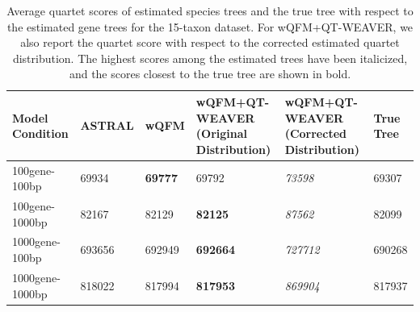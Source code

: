 \documentclass[10pt,a4paper]{article}
\begin{document}

\begin{table}[h!]
    \centering
    \caption{Average quartet scores of estimated species trees and the true tree with respect to the estimated gene trees for the 15-taxon dataset. For wQFM+QT-WEAVER, we also report the quartet score with respect to the corrected estimated quartet distribution. The highest scores among the estimated trees have been italicized, and the scores closest to the true tree are shown in bold.}
    \label{tab:15-quartet-scores-estimated}
    \begin{tabular}{|C{2cm}|C{2.5cm}|C{2.5cm}|C{2.5cm}|C{2.5cm}|C{2.5cm}|}
        \hline
        \textbf{Model Condition} & \textbf{ASTRAL} & \textbf{wQFM} & \textbf{wQFM+QT-WEAVER (Original Distribution)} & \textbf{wQFM+QT-WEAVER (Corrected Distribution)} & \textbf{True Tree} \\
        \hline \hline
        100gene-100bp & 69934 & \textbf{69777} & 69792 & \textit{73598} & 69307 \\
        \hline
        100gene-1000bp & 82167 & 82129 & \textbf{82125} & \textit{87562} & 82099 \\
        \hline
        1000gene-100bp & 693656 & 692949 & \textbf{692664} & \textit{727712} & 690268 \\
        \hline
        1000gene-1000bp & 818022 & 817994 & \textbf{817953} & \textit{869904} & 817937 \\
        \hline
    \end{tabular}
\end{table}
\end{document}
